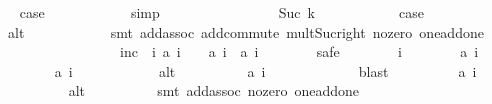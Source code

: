 \begin{isabellebody}
\ \isamarkupfalse%
\ {\isacharquery}case\isanewline
\ \ \ \ \ \ \ \ \ \ \isamarkupfalse%
\ simp\isanewline
\ \ \ \ \ \ \isamarkupfalse%
\isanewline
\ \ \ \ \ \ \ \ \isamarkupfalse%
\ {\isacharparenleft}Suc\ k{\isacharparenright}\isanewline
\ \ \ \ \ \ \ \ \isamarkupfalse%
\ \isamarkupfalse%
\ {\isacharquery}case\isanewline
\ \ \ \ \ \ \ \ \ \ \isamarkupfalse%
\ alt\isanewline
\ \ \ \ \ \ \ \ \ \ \isamarkupfalse%
\ {\isacharparenleft}smt\ add{\isachardot}assoc\ add{\isachardot}commute\ mult{\isacharunderscore}Suc{\isacharunderscore}right\ no{\isacharunderscore}zero\ one{\isacharunderscore}add{\isacharunderscore}one{\isacharparenright}\isanewline
\ \ \ \ \ \ \isamarkupfalse%
\isanewline
\ \ \ \ \isamarkupfalse%
\isanewline
\isanewline
\ \ \ \ \isamarkupfalse%
\ inc{\isacharcolon}\ {\isachardoublequoteopen}{\isasymforall}\ i{\isachardot}\ {\isacharquery}a\ i\ {\isacharless}\ {}\ {\isasymlongrightarrow}\ {\isacharquery}a\ i\ {\isacharless}\ {\isacharquery}a\ {\isacharparenleft}i\ {\isacharplus}\ {}{\isacharparenright}{\isachardoublequoteclose}\isanewline
\ \ \ \ \isamarkupfalse%
\ safe\isanewline
\ \ \ \ \ \ \isamarkupfalse%
\ i\isanewline
\ \ \ \ \ \ \isamarkupfalse%
\ {\isachardoublequoteopen}{\isacharquery}a\ i\ {\isacharless}\ {}{\isachardoublequoteclose}\isanewline
\ \ \ \ \ \ \isamarkupfalse%
\ {\isachardoublequoteopen}{\isacharquery}a\ {\isacharparenleft}i{\isacharplus}{}{\isacharparenright}\ {\isachargreater}\ {}{\isachardoublequoteclose}\isanewline
\ \ \ \ \ \ \ \ \isamarkupfalse%
\ alt\isanewline
\ \ \ \ \ \ \ \ \isamarkupfalse%
\ {\isacartoucheopen}{\isacharquery}a\ i\ {\isacharless}\ {}{\isacartoucheclose}\ \isanewline
\ \ \ \ \ \ \ \ \isamarkupfalse%
\ blast\isanewline
\ \ \ \ \ \ \isamarkupfalse%
\ \isamarkupfalse%
\ {\isachardoublequoteopen}{\isacharquery}a\ {\isacharparenleft}i{\isacharplus}{}{\isacharparenright}\ {\isacharless}\ {}{\isachardoublequoteclose}\isanewline
\ \ \ \ \ \ \ \ \isamarkupfalse%
\ alt\isanewline
\ \ \ \ \ \ \ \ \isamarkupfalse%
\ {\isacharparenleft}smt\ add{\isachardot}assoc\ no{\isacharunderscore}zero\ one{\isacharunderscore}add{\isacharunderscore}one{\isacharparenright}\isanewline

\end{isabellebody}
